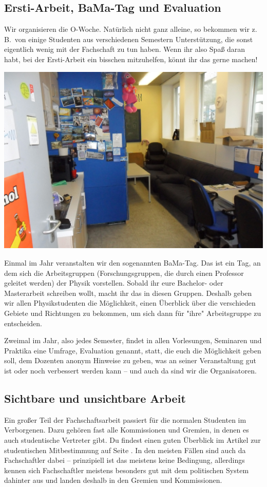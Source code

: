 \begin{multicols}{2}
\subsection*{Ersti-Arbeit, BaMa-Tag und Evaluation}
Wir organisieren die O-Woche.
Natürlich nicht ganz alleine, so bekommen wir z.\,B.\ von einige Studenten aus verschiedenen Semestern Unterstützung, die sonst eigentlich wenig mit der Fachschaft zu tun haben.
Wenn ihr also Spaß daran habt, bei der Ersti-Arbeit ein bisschen mitzuhelfen, könnt ihr das gerne machen!

\includegraphics[width=\columnwidth]{res/fsphys_foto_fs_raum_cropped.jpg}

Einmal im Jahr veranstalten wir den sogenannten BaMa-Tag.
Das ist ein Tag, an dem sich die Arbeitsgruppen (Forschungsgruppen, die durch einen Professor geleitet werden) der Physik vorstellen.
Sobald ihr eure Bachelor- oder Masterarbeit schreiben wollt, macht ihr das in diesen Gruppen.
Deshalb geben wir allen Physikstudenten die Möglichkeit, einen Überblick über die verschieden Gebiete und Richtungen zu bekommen, um sich dann für "ihre" Arbeitsgruppe zu entscheiden.

Zweimal im Jahr, also jedes Semester, findet in allen Vorlesungen, Seminaren und Praktika eine Umfrage, Evaluation genannt, statt, die euch die Möglichkeit geben soll, dem Dozenten anonym Hinweise zu geben, was an seiner Veranstaltung gut ist oder noch verbessert werden kann -- und auch da sind wir die Organisatoren.

\subsection*{Sichtbare und unsichtbare Arbeit}
Ein großer Teil der Fachschaftsarbeit passiert für die normalen Studenten im Verborgenen.
Dazu gehören fast alle Kommissionen und Gremien, in denen es auch studentische Vertreter gibt.
Du findest einen guten Überblick im Artikel zur studentischen Mitbestimmung auf Seite \pageref{studmit}.
In den meisten Fällen sind auch da Fachschaftler dabei -- prinzipiell ist das meistens keine Bedingung, allerdings kennen sich Fachschaftler meistens besonders gut mit dem politischen System dahinter aus und landen deshalb in den Gremien und Kommissionen.


\end{multicols}
